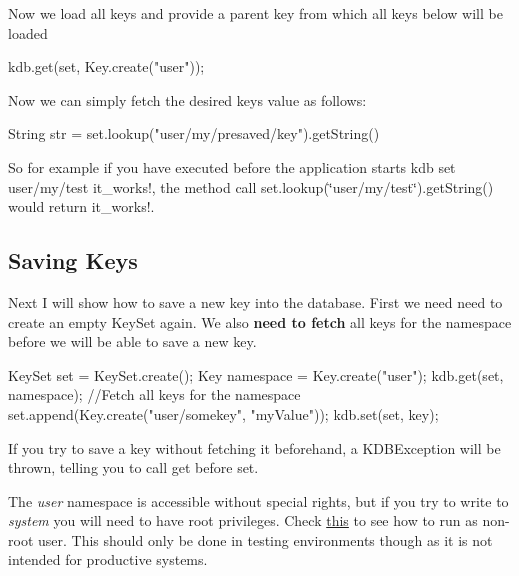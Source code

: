 Now we load all keys and provide a parent key from which all keys below will be loaded


\begin{DoxyCode}
kdb.get(\textcolor{keyword}{set}, Key.create(\textcolor{stringliteral}{"user"}));
\end{DoxyCode}


Now we can simply fetch the desired key\textquotesingle{}s value as follows\+:


\begin{DoxyCode}
String str = \textcolor{keyword}{set}.lookup(\textcolor{stringliteral}{"user/my/presaved/key"}).getString()
\end{DoxyCode}


So for example if you have executed before the application starts {\ttfamily kdb set user/my/test it\+\_\+works!}, the method call {\ttfamily set.\+lookup(\char`\"{}user/my/test\char`\"{}).get\+String()} would return {\ttfamily it\+\_\+works!}.

\subsection*{Saving Keys}

Next I will show how to save a new key into the database. First we need need to create an empty {\ttfamily Key\+Set} again. We also {\bfseries need to fetch} all keys for the namespace before we will be able to save a new key.


\begin{DoxyCode}
KeySet \textcolor{keyword}{set} = KeySet.create();
Key \textcolor{keyword}{namespace }= Key.create("user");
kdb.get(\textcolor{keyword}{set}, \textcolor{keyword}{namespace});    \textcolor{comment}{//Fetch all keys for the namespace}
\textcolor{keyword}{set}.append(Key.create(\textcolor{stringliteral}{"user/somekey"}, \textcolor{stringliteral}{"myValue"}));
kdb.set(\textcolor{keyword}{set}, key);
\end{DoxyCode}


If you try to save a key without fetching it beforehand, a {\ttfamily K\+D\+B\+Exception} will be thrown, telling you to call get before set.

The {\itshape user} namespace is accessible without special rights, but if you try to write to {\itshape system} you will need to have root privileges. Check \hyperlink{doc_TESTING_md}{this} to see how to run as non-\/root user. This should only be done in testing environments though as it is not intended for productive systems.

